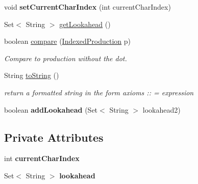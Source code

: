 \begin{DoxyCompactItemize}
\item 
\hypertarget{classcontext_free_1_1parser_1_1_indexed_production_a9673f863b315e7cff584048585906718}{void {\bfseries set\-Current\-Char\-Index} (int current\-Char\-Index)}\label{classcontext_free_1_1parser_1_1_indexed_production_a9673f863b315e7cff584048585906718}

\item 
Set$<$ String $>$ \hyperlink{classcontext_free_1_1parser_1_1_indexed_production_a94e0e318a96518ee50607e682e7f0382}{get\-Lookahead} ()
\item 
boolean \hyperlink{classcontext_free_1_1parser_1_1_indexed_production_aa79a2e2cbbc1f35d6416647d80daf3d8}{compare} (\hyperlink{classcontext_free_1_1parser_1_1_indexed_production}{Indexed\-Production} p)
\begin{DoxyCompactList}\small\item\em Compare to production without the dot. \end{DoxyCompactList}\item 
\hypertarget{classcontext_free_1_1parser_1_1_indexed_production_a061cd84bd37e6111edcd52bcb5b9c749}{String \hyperlink{classcontext_free_1_1parser_1_1_indexed_production_a061cd84bd37e6111edcd52bcb5b9c749}{to\-String} ()}\label{classcontext_free_1_1parser_1_1_indexed_production_a061cd84bd37e6111edcd52bcb5b9c749}

\begin{DoxyCompactList}\small\item\em return a formatted string in the form axioms \-:\-: = expression \end{DoxyCompactList}\item 
\hypertarget{classcontext_free_1_1parser_1_1_indexed_production_ae6af99251737ae274afc4028fa6eb13e}{boolean {\bfseries add\-Lookahead} (Set$<$ String $>$ lookahead2)}\label{classcontext_free_1_1parser_1_1_indexed_production_ae6af99251737ae274afc4028fa6eb13e}

\end{DoxyCompactItemize}
\subsection*{Private Attributes}
\begin{DoxyCompactItemize}
\item 
\hypertarget{classcontext_free_1_1parser_1_1_indexed_production_a8ed426b66a378ce272cc13ae397e52cd}{int {\bfseries current\-Char\-Index}}\label{classcontext_free_1_1parser_1_1_indexed_production_a8ed426b66a378ce272cc13ae397e52cd}

\item 
\hypertarget{classcontext_free_1_1parser_1_1_indexed_production_a58e8935cd1c81a767b47b4d31c87b35c}{Set$<$ String $>$ {\bfseries lookahead}}\label{classcontext_free_1_1parser_1_1_indexed_production_a58e8935cd1c81a767b47b4d31c87b35c}

\end{DoxyCompactItemize}


